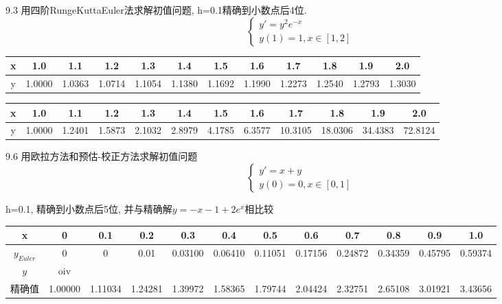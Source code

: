\documentclass[a4paper, 10pt]{article}
\begin{document}
\begin{CJK}{UTF8}{gbsn}
9.3
用四阶RungeKuttaEuler法求解初值问题, h=0.1精确到小数点后4位. \\
\begin{equation*}
	\begin{cases}
		y' = y^{2}e^{-x} \\
		y(1) = 1, x\in[1,2]
	\end{cases}
\end{equation*}


\begin{tabular}{c|c c c c c c c c c c c}
\hline
 x & 1.0 & 1.1 & 1.2 & 1.3 & 1.4 & 1.5 & 1.6 & 1.7 & 1.8 & 1.9 & 2.0 \\
 \hline
 y & 1.0000 & 1.0363 & 1.0714 & 1.1054 & 1.1380 & 1.1692 & 1.1990 & 1.2273 & 1.2540 & 1.2793 & 1.3030 \\
 \hline
\end{tabular}


\begin{tabular}{c|c c c c c c c c c c c}
\hline
 x & 1.0 & 1.1 & 1.2 & 1.3 & 1.4 & 1.5 & 1.6 & 1.7 & 1.8 & 1.9 & 2.0 \\
\hline
y & 1.0000 & 1.2401 & 1.5873 & 2.1032 & 2.8979 & 4.1785 & 6.3577 & 10.3105 & 18.0306 & 34.4383 & 72.8124 \\
\hline
\end{tabular}

9.6
用欧拉方法和预估-校正方法求解初值问题
\begin{equation}
	\begin{cases}
		y' = x+y \\
		y(0) = 0, x\in[0,1]
	\end{cases}
\end{equation}

h=0.1, 精确到小数点后5位, 并与精确解$y=-x-1+2e^x$相比较

\begin{tabular}{c|c c c c c c c c c c c}
\hline
x & 0 & 0.1 & 0.2 & 0.3 & 0.4 & 0.5 & 0.6 & 0.7 & 0.8 & 0.9 & 1.0 \\
\hline
$y_{Euler}$ & 0 & 0 & 0.01 & 0.03100 & 0.06410 & 0.11051 & 0.17156 & 0.24872 & 0.34359 & 0.45795 & 0.59374 \\
$y_{}$ & oiv \\
\hline
精确值 & 1.00000 & 1.11034 & 1.24281 & 1.39972 & 1.58365 & 1.79744 & 2.04424 & 2.32751 & 2.65108 & 3.01921 & 3.43656 \\
\hline

\end{tabular}
\end{CJK}
\end{document}
